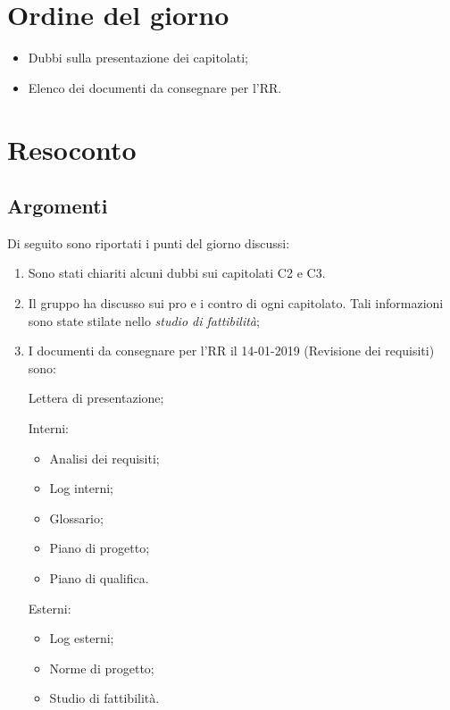 \documentclass[12pt]{article}
\begin{document}
\section{Ordine del giorno}
    \begin{itemize}
        \item Dubbi sulla presentazione dei capitolati;
        \item Elenco dei documenti da consegnare per l'RR.
    \end{itemize}
    
    \newpage
\section{Resoconto}
    \subsection{Argomenti}
        Di seguito sono riportati i punti del giorno discussi:
    \begin{enumerate}
        \item Sono stati chiariti alcuni dubbi sui capitolati C2 e C3.
        \item Il gruppo ha discusso sui pro e i contro di ogni capitolato. Tali informazioni sono state stilate nello \textit{studio di fattibilità};
        \item I documenti da consegnare per l'RR il 14-01-2019 (Revisione dei requisiti) sono:
            
            Lettera di presentazione;
            
            Interni:
            \begin{itemize}
            \item Analisi dei requisiti;
            \item Log interni;
            \item Glossario;
            \item Piano di progetto;
            \item Piano di qualifica.
            \end{itemize}
            
            Esterni:
            \begin{itemize}
            \item Log esterni;
            \item Norme di progetto;
            \item Studio di fattibilità.
            \end{itemize}
    \end{enumerate}
\end{document}
